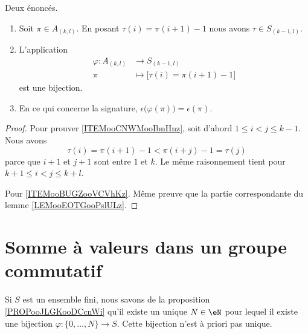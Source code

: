 \begin{lemma}		\label{LEMooCKJAooBIAyVs}
	Deux énoncés.
	\begin{enumerate}
		\item		\label{ITEMooCNWMooIbnHnz}
		      Soit \( \pi\in A_{(k,l)}\). En posant \( \tau(i)=\pi(i+1)-1\) nous avons \( \tau\in S_{(k-1,l)}\).
		\item		\label{ITEMooKNKRooWbLYrF}
		      L'application
		      \begin{equation}
			      \begin{aligned}
				      \varphi\colon A_{(k,l)} & \to S_{(k-1,l)}                          \\
				      \pi                     & \mapsto \Big[  \tau(i)=\pi(i+1)-1  \Big]
			      \end{aligned}
		      \end{equation}
		      est une bijection.
		\item
		      En ce qui concerne la signature, \( \epsilon\big( \varphi(\pi) \big)=\epsilon(\pi)\).
	\end{enumerate}
\end{lemma}

\begin{proof}
	Pour prouver \ref{ITEMooCNWMooIbnHnz}, soit d'abord \( 1\leq i<j\leq k-1\). Nous avons
	\begin{equation}
		\tau(i)=\pi(i+1)-1<\pi(i+j)-1=\tau(j)
	\end{equation}
	parce que \( i+1\) et \( j+1\) sont entre \( 1\) et \( k\). Le même raisonnement tient pour \( k+1\leq i<j\leq k+l\).

	Pour \ref{ITEMooBUGZooVCVhKz}. Même preuve que la partie correspondante du lemme \ref{LEMooEOTGooPslULz}.
\end{proof}




\section{Somme à valeurs dans un groupe commutatif}


Si \( S\) est un ensemble fini, nous savons de la proposition \ref{PROPooJLGKooDCcnWi} qu'il existe un unique \( N\in \eN\) pour lequel il existe une bijection \( \varphi\colon \{ 0,\ldots, N \}\to S\). Cette bijection n'est à priori pas unique.

